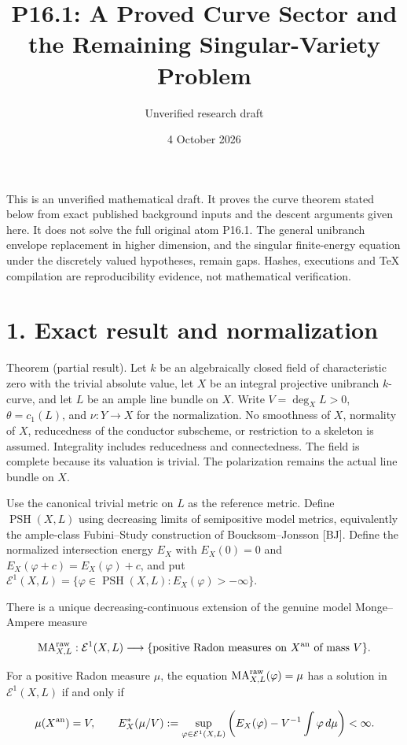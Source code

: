 \documentclass[11pt]{article}
\title{P16.1: A Proved Curve Sector and the Remaining Singular-Variety Problem}
\author{Unverified research draft}
\date{4 October 2026}
\begin{document}
\maketitle
This is an unverified mathematical draft. It proves the curve theorem stated below from exact published background inputs and the descent arguments given here. It does not solve the full original atom P16.1. The general unibranch envelope replacement in higher dimension, and the singular finite-energy equation under the discretely valued hypotheses, remain gaps. Hashes, executions and TeX compilation are reproducibility evidence, not mathematical verification.

\section*{1. Exact result and normalization}
Theorem (partial result). Let $k$ be an algebraically closed field of characteristic zero with the trivial absolute value, let $X$ be an integral projective unibranch $k$-curve, and let $L$ be an ample line bundle on $X$. Write $V=\deg_X L>0$, $\theta=c_1(L)$, and $\nu:Y\longrightarrow X$ for the normalization. No smoothness of $X$, normality of $X$, reducedness of the conductor subscheme, or restriction to a skeleton is assumed. Integrality includes reducedness and connectedness. The field is complete because its valuation is trivial. The polarization remains the actual line bundle on $X$.

Use the canonical trivial metric on $L$ as the reference metric. Define $\operatorname{PSH}(X,L)$ using decreasing limits of semipositive model metrics, equivalently the ample-class Fubini--Study construction of Boucksom--Jonsson [BJ]. Define the normalized intersection energy $E_X$ with $E_X(0)=0$ and $E_X(\varphi+c)=E_X(\varphi)+c$, and put $\mathcal E^1(X,L)=\{\varphi\in\operatorname{PSH}(X,L):E_X(\varphi)>-\infty\}$.

There is a unique decreasing-continuous extension of the genuine model Monge--Ampere measure

\[
 \mathrm{MA}^{\rm raw}_{X,L}:\mathcal E^1(X,L)\longrightarrow
 \{\hbox{positive Radon measures on }X^{\rm an}\hbox{ of mass }V\}.
\]

For a positive Radon measure $\mu$, the equation $\mathrm{MA}^{\rm raw}_{X,L}(\varphi)=\mu$ has a solution in $\mathcal E^1(X,L)$ if and only if

\[
 \mu(X^{\rm an})=V,\qquad
 E_X^*(\mu/V):=\sup_{\varphi\in\mathcal E^1(X,L)}
 \left(E_X(\varphi)-V^{-1}\int\varphi\,d\mu\right)<\infty.
\]
\end{document}
